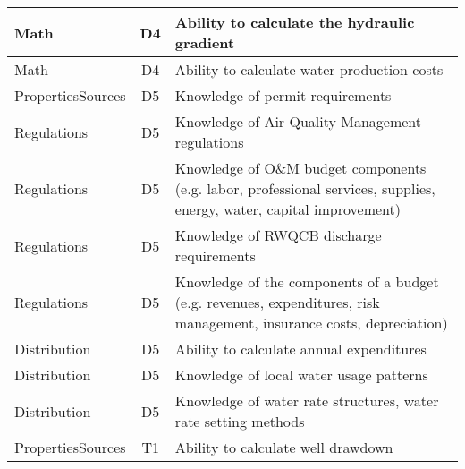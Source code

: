 \documentclass{article}
\begin{document}
\begin{table}[]
\begin{tabular}{|l|c|l|}
Math                                   & D4             & Ability to calculate the hydraulic gradient                                                                                       \\ \hline
Math                                   & D4             & Ability to calculate water production costs                                                                                       \\ \hline
PropertiesSources                      & D5             & Knowledge of permit   requirements                                                                                                \\ \hline
Regulations                            & D5             & Knowledge of Air   Quality Management regulations                                                                                 \\ \hline
Regulations                            & D5             & Knowledge of O\&M   budget components (e.g. labor, professional services, supplies, energy,   water, capital improvement)         \\ \hline
Regulations                            & D5             & Knowledge of RWQCB   discharge requirements                                                                                       \\ \hline
Regulations                            & D5             & Knowledge of the   components of a budget (e.g. revenues, expenditures, risk management,   insurance costs, depreciation)         \\ \hline
Distribution                           & D5             & Ability to calculate   annual expenditures                                                                                        \\ \hline
Distribution                           & D5             & Knowledge of local   water usage patterns                                                                                         \\ \hline
Distribution                           & D5             & Knowledge of water   rate structures, water rate setting methods                                                                  \\ \hline
PropertiesSources                      & T1             & Ability to calculate   well drawdown                                                                                              \\ \hline

\end{tabular}
\end{table}
\end{document}
